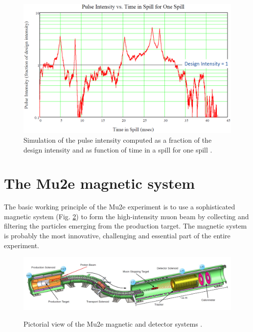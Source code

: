 \documentclass[12pt,a4paper,openright, oneside, titlepage]{book} %
\begin{document}
\begin{figure}[!htb]
\centering
\includegraphics[scale=0.6]{POT_sim}
\caption[Proton pulse intensity fluctuations]{Simulation of the pulse intensity computed as a fraction of the design intensity and as function of time in a spill for one spill \cite{SpillSim}.}
\label{_POT_sim}
\end{figure}

\section{The Mu2e magnetic system}
The basic working principle of the Mu2e experiment is to use a sophisticated magnetic system (Fig. \ref{_mu2e_apparatus_pre}) to form the high-intensity muon beam by collecting and filtering the particles emerging from the production target. 
The magnetic system is probably the most innovative, challenging and essential part of the entire experiment. 

\begin{figure}[h!]
\centering
\includegraphics[scale=0.6]{mu2e_apparatus}\\
\caption[Mu2e apparatus]{Pictorial view of the Mu2e magnetic and detector systems \cite{Giovannella}.}
\label{_mu2e_apparatus_pre}
\end{figure}
\end{document}
